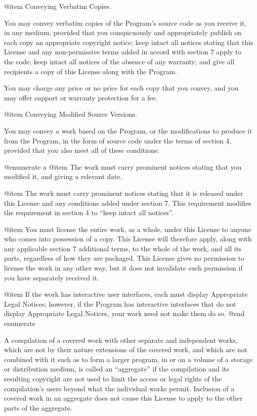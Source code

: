 @item Conveying Verbatim Copies.

You may convey verbatim copies of the Program's source code as you
receive it, in any medium, provided that you conspicuously and
appropriately publish on each copy an appropriate copyright notice;
keep intact all notices stating that this License and any
non-permissive terms added in accord with section 7 apply to the code;
keep intact all notices of the absence of any warranty; and give all
recipients a copy of this License along with the Program.

You may charge any price or no price for each copy that you convey,
and you may offer support or warranty protection for a fee.

@item Conveying Modified Source Versions.

You may convey a work based on the Program, or the modifications to
produce it from the Program, in the form of source code under the
terms of section 4, provided that you also meet all of these
conditions:

@enumerate a
@item
The work must carry prominent notices stating that you modified it,
and giving a relevant date.

@item
The work must carry prominent notices stating that it is released
under this License and any conditions added under section 7.  This
requirement modifies the requirement in section 4 to ``keep intact all
notices''.

@item
You must license the entire work, as a whole, under this License to
anyone who comes into possession of a copy.  This License will
therefore apply, along with any applicable section 7 additional terms,
to the whole of the work, and all its parts, regardless of how they
are packaged.  This License gives no permission to license the work in
any other way, but it does not invalidate such permission if you have
separately received it.

@item
If the work has interactive user interfaces, each must display
Appropriate Legal Notices; however, if the Program has interactive
interfaces that do not display Appropriate Legal Notices, your work
need not make them do so.
@end enumerate

A compilation of a covered work with other separate and independent
works, which are not by their nature extensions of the covered work,
and which are not combined with it such as to form a larger program,
in or on a volume of a storage or distribution medium, is called an
``aggregate'' if the compilation and its resulting copyright are not
used to limit the access or legal rights of the compilation's users
beyond what the individual works permit.  Inclusion of a covered work
in an aggregate does not cause this License to apply to the other
parts of the aggregate.

